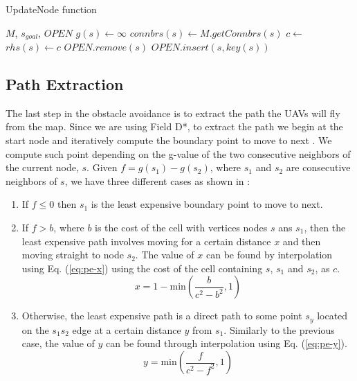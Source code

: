 \begin{algorithm}
	\algrenewcommand{}
	\algrenewcommand{}
	\caption{UpdateNode function}\label{alg:upnode}
	\begin{algorithmic}[1]
		\Require $M$, $s_{goal}$, $OPEN$
			\State $g(s) \gets \infty$
			\EndIf
			\State $connbrs(s) \gets M.getConnbrs(s)$
				\State $c \gets$ 
				\State $rhs(s) \gets c$ 
				\EndIf
			\EndFor
			\EndIf
			\State $OPEN.remove(s)$ 
			\EndIf
			\State $OPEN.insert(s, key(s))$ 
			\EndIf
		\EndFunction
	\end{algorithmic}
\end{algorithm}

\subsection{Path Extraction}

The last step in the obstacle avoidance is to extract the path the UAVs will fly from the map. 
Since we are using Field D*, to extract the path we begin at the start node and iteratively 
compute the boundary point to move to next \autocite{DF06}. We compute such point depending on
the g-value of the two consecutive neighbors of the current node, $s$. Given $f = g(s_1) - g(s_2)$,
where $s_1$ and $s_2$ are consecutive neighbors of $s$, we have three different cases as
shown in \autocite{DF06}:

\begin{enumerate}
	\item If $f \le 0$ then $s_1$ is the least expensive boundary point to move to next. 
	\item If $f > b$, where $b$ is the cost of the cell with vertices nodes $s$ ans $s_1$, then
		the least expensive path involves moving for a certain distance $x$ and then moving
		straight to node $s_2$. The value of $x$ can be found by interpolation using Eq. (\ref{eq:pe-x})
		using the cost of the cell containing $s$, $s_1$ and $s_2$, as $c$.
		\begin{equation}
			x = 1 - \mathrm{min}\left(\frac{b}{c^2 - b^2},1\right)
			\label{eq:pe-x}
		\end{equation}
	\item Otherwise, the least expensive path is a direct path to some point $s_y$ located on the 
		$s_1s_2$ edge at a certain distance $y$ from $s_1$. Similarly to the previous case,
		the value of $y$ can be found through interpolation using Eq. (\ref{eq:pe-y}).
		\begin{equation}
			y = \mathrm{min}\left(\frac{f}{c^2 - f^2},1\right)
			\label{eq:pe-y}
		\end{equation}
\end{enumerate}

